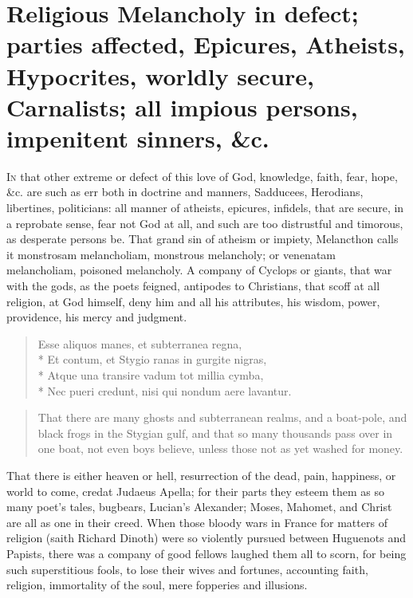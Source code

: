 {%

\section[Religious Melancholy in defect]{Religious Melancholy in defect; parties affected, Epicures, Atheists, Hypocrites, worldly secure, Carnalists; all impious persons, impenitent sinners, \&c.}

\lettrine{I}{n} that other extreme or defect of this love of God, knowledge, faith,
fear, hope, \&c. are such as err both in doctrine and manners,
Sadducees, Herodians, libertines, politicians: all manner of atheists,
epicures, infidels, that are secure, in a reprobate sense, fear not God
at all, and such are too distrustful and timorous, as desperate persons
be. That grand sin of atheism or impiety, Melancthon calls it
monstrosam melancholiam, monstrous melancholy; or venenatam
melancholiam, poisoned melancholy. A company of Cyclops or giants, that
war with the gods, as the poets feigned, antipodes to Christians, that
scoff at all religion, at God himself, deny him and all his attributes,
his wisdom, power, providence, his mercy and judgment.

\begin{latin}
\begin{verse}
Esse aliquos manes, et subterranea regna,\\*
Et contum, et Stygio ranas in gurgite nigras,\\*
Atque una transire vadum tot millia cymba,\\*
Nec pueri credunt, nisi qui nondum aere lavantur.
\end{verse}
\end{latin}

\begin{quote}
 That there are many ghosts and subterranean realms, and a boat-pole, and black frogs in the Stygian gulf, and that so many thousands pass over in one boat, not even boys believe, unless those not as yet washed for money.
\end{quote}

That there is either heaven or hell, resurrection of the dead, pain,
happiness, or world to come, credat Judaeus Apella; for their parts
they esteem them as so many poet's tales, bugbears, Lucian's Alexander;
Moses, Mahomet, and Christ are all as one in their creed. When those
bloody wars in France for matters of religion (saith Richard
Dinoth) were so violently pursued between Huguenots and Papists, there
was a company of good fellows laughed them all to scorn, for being such
superstitious fools, to lose their wives and fortunes, accounting
faith, religion, immortality of the soul, mere fopperies and illusions.

}
